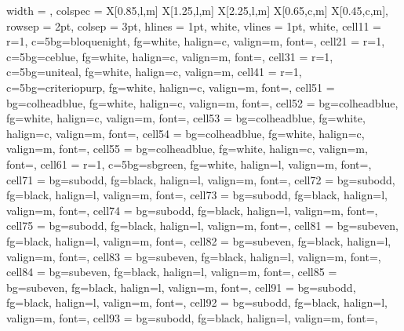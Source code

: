 \documentclass[a4paper,12pt]{article}
\begin{document}
\noindent
\begin{longtblr}{
  width      = \textwidth,
  colspec    = {X[0.85,l,m] X[1.25,l,m] X[2.25,l,m] X[0.65,c,m] X[0.45,c,m]},
  rowsep     = 2pt,
  colsep     = 3pt,
  hlines     = {1pt, white},
  vlines     = {1pt, white},
  cell{1}{1} = {r=1, c=5}{bg=bloquenight, fg=white, halign=c, valign=m, font=\bfseries},
  cell{2}{1} = {r=1, c=5}{bg=ceblue, fg=white, halign=c, valign=m, font=\small\bfseries},
  cell{3}{1} = {r=1, c=5}{bg=uniteal, fg=white, halign=c, valign=m},
  cell{4}{1} = {r=1, c=5}{bg=criteriopurp, fg=white, halign=c, valign=m, font=\small\bfseries},
  cell{5}{1} = {bg=colheadblue, fg=white, halign=c, valign=m, font=\bfseries},
  cell{5}{2} = {bg=colheadblue, fg=white, halign=c, valign=m, font=\bfseries},
  cell{5}{3} = {bg=colheadblue, fg=white, halign=c, valign=m, font=\bfseries},
  cell{5}{4} = {bg=colheadblue, fg=white, halign=c, valign=m, font=\bfseries},
  cell{5}{5} = {bg=colheadblue, fg=white, halign=c, valign=m, font=\bfseries},
  cell{6}{1} = {r=1, c=5}{bg=sbgreen, fg=white, halign=l, valign=m, font=\small\bfseries},
  cell{7}{1}  = {bg=subodd,  fg=black, halign=l, valign=m, font=\footnotesize},
  cell{7}{2}  = {bg=subodd,  fg=black, halign=l, valign=m, font=\footnotesize},
  cell{7}{3}  = {bg=subodd,  fg=black, halign=l, valign=m, font=\footnotesize},
  cell{7}{4}  = {bg=subodd,  fg=black, halign=l, valign=m, font=\footnotesize},
  cell{7}{5}  = {bg=subodd,  fg=black, halign=l, valign=m, font=\footnotesize},
  cell{8}{1}  = {bg=subeven, fg=black, halign=l, valign=m, font=\footnotesize},
  cell{8}{2}  = {bg=subeven, fg=black, halign=l, valign=m, font=\footnotesize},
  cell{8}{3}  = {bg=subeven, fg=black, halign=l, valign=m, font=\footnotesize},
  cell{8}{4}  = {bg=subeven, fg=black, halign=l, valign=m, font=\footnotesize},
  cell{8}{5}  = {bg=subeven, fg=black, halign=l, valign=m, font=\footnotesize},
  cell{9}{1}  = {bg=subodd,  fg=black, halign=l, valign=m, font=\footnotesize},
  cell{9}{2}  = {bg=subodd,  fg=black, halign=l, valign=m, font=\footnotesize},
  cell{9}{3}  = {bg=subodd,  fg=black, halign=l, valign=m, font=\footnotesize},
}
\end{longtblr}
\end{document}
